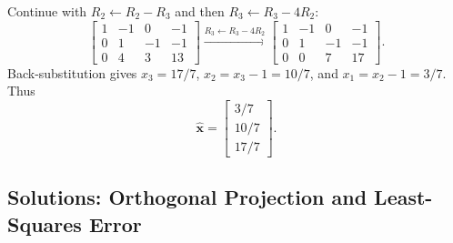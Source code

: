 \documentclass[11pt, letterpaper]{article}
\theoremstyle{definition}
\theoremstyle{remark}
\begin{document}
Continue with $R_2 \leftarrow R_2 - R_3$ and then $R_3 \leftarrow R_3 - 4R_2$:
\[
\left[\begin{array}{ccc|c} 1 & -1 & 0 & -1 \\ 0 & 1 & -1 & -1 \\ 0 & 4 & 3 & 13 \end{array}\right] \xrightarrow{R_3 \leftarrow R_3 - 4R_2} \left[\begin{array}{ccc|c} 1 & -1 & 0 & -1 \\ 0 & 1 & -1 & -1 \\ 0 & 0 & 7 & 17 \end{array}\right].
\]
Back-substitution gives $x_3 = 17/7$, $x_2 = x_3 - 1 = 10/7$, and $x_1 = x_2 - 1 = 3/7$. Thus
\[
\hat{\mathbf{x}} = \begin{bmatrix} 3/7 \\ 10/7 \\ 17/7 \end{bmatrix}.
\]

\subsection{Solutions: Orthogonal Projection and Least-Squares Error}
\end{document}
